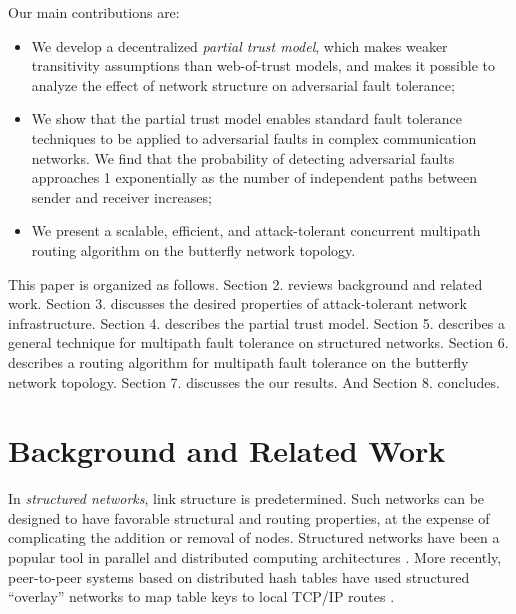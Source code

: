 \documentclass{sig-alternate-05-2015}
\begin{document}
Our main contributions are:
\begin{itemize}
\item{We develop a decentralized {\em partial trust model},
which makes weaker transitivity assumptions than web-of-trust models,
and makes it possible to analyze the effect of network structure on
adversarial fault tolerance;}
\item{We show that the partial trust model enables standard fault
tolerance techniques to be applied to adversarial faults in
complex communication networks.
We find that the probability of detecting adversarial faults
approaches 1 exponentially as the number of independent paths between
sender and receiver increases;}
\item{We present a scalable, efficient, and attack-tolerant concurrent
multipath routing algorithm on the butterfly network topology.}
\end{itemize}

This paper is organized as follows.
Section 2. reviews background and related work.
Section 3. discusses the desired properties of attack-tolerant network
infrastructure.
Section 4. describes the partial trust model.
Section 5. describes a general technique for multipath fault tolerance on
structured networks.
Section 6. describes a routing algorithm for multipath fault tolerance
on the butterfly network topology.
Section 7. discusses the our results.
And Section 8. concludes.

\section{Background and Related Work}

In {\em structured networks}, link structure is predetermined.
Such networks can be designed to have favorable structural and routing properties,
at the expense of complicating the addition or removal of nodes.
Structured networks have been a popular tool in parallel and distributed
computing architectures \cite{kshemkalyani_distributed_2008}.
More recently, peer-to-peer systems based on distributed hash tables have used
structured ``overlay'' networks to map table keys to local TCP/IP routes
\cite{lua_survey_2005,korzun_structured_2013}.
\end{document}
